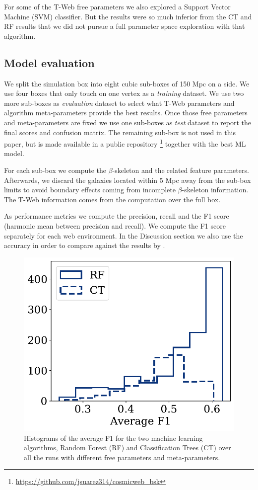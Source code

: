 \documentclass[usenatbib]{mnras}
\begin{document}
For some of the T-Web free parameters we also explored a Support Vector Machine (SVM) classifier. 
But the results were so much inferior from the CT and RF results that we did not pursue a full parameter space exploration with that algorithm.


\subsection{Model evaluation}

We split the simulation box into eight cubic sub-boxes of 150 Mpc on a side.
We use four boxes that only touch on one vertex as a \emph{training} dataset.
We use two more sub-boxes as \emph{evaluation} dataset to select what T-Web parameters and algorithm meta-parameters provide the best results.
Once those free parameters and meta-parameters are fixed we use one sub-boxes as \emph{test} dataset to report the final scores and confusion matrix.
The remaining sub-box is not used in this paper, but is made available in a public repository \footnote{\url{https://github.com/jsuarez314/cosmicweb_bsk}} together with the best ML model. 

For each sub-box we compute the $\beta$-skeleton and the related feature parameters. 
Afterwards, we discard the galaxies located within 5 Mpc away from the sub-box limits to avoid boundary effects coming from incomplete $\beta$-skeleton information.
The T-Web information comes from the computation over the full box.

As performance metrics we compute the precision, recall and the F1
score (harmonic mean between precision and recall).  
We compute the F1 score separately for each web environment.
In the Discussion section we also use the accuracy in order to compare against the results by \citep{Tsizh2019}.

\begin{figure}
    \includegraphics[scale=0.55]{Figs/p_hist_f1.pdf}
    \caption{Histograms of the average F1 for the two machine
      learning algorithms, Random Forest (RF) and Classification Trees (CT) over all the runs with different free parameters and meta-parameters.}
    \label{fig:methods}
\end{figure}
\end{document}
